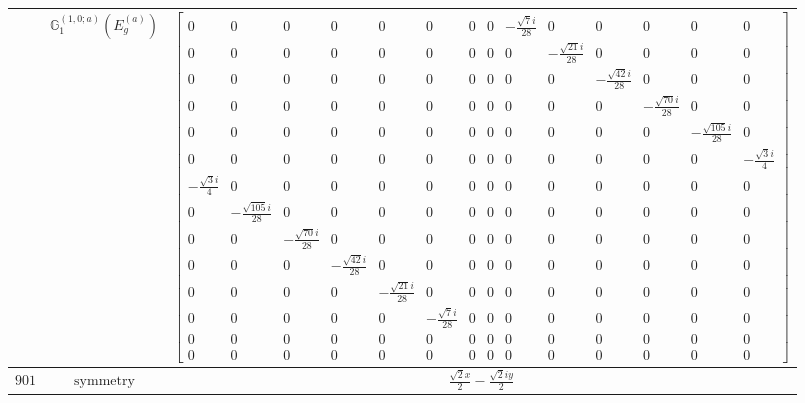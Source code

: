 \documentclass[fleqn,8pt,landscape]{jsarticle}
\begin{document}
\begin{longtable}{ccc}
$  $ & $ \mathbb{G}_{1}^{(1,0;a)}(E_{g}^{(a)}) $ & $ \begin{bmatrix} 0 & 0 & 0 & 0 & 0 & 0 & 0 & 0 & - \frac{\sqrt{7} i}{28} & 0 & 0 & 0 & 0 & 0 \\ 0 & 0 & 0 & 0 & 0 & 0 & 0 & 0 & 0 & - \frac{\sqrt{21} i}{28} & 0 & 0 & 0 & 0 \\ 0 & 0 & 0 & 0 & 0 & 0 & 0 & 0 & 0 & 0 & - \frac{\sqrt{42} i}{28} & 0 & 0 & 0 \\ 0 & 0 & 0 & 0 & 0 & 0 & 0 & 0 & 0 & 0 & 0 & - \frac{\sqrt{70} i}{28} & 0 & 0 \\ 0 & 0 & 0 & 0 & 0 & 0 & 0 & 0 & 0 & 0 & 0 & 0 & - \frac{\sqrt{105} i}{28} & 0 \\ 0 & 0 & 0 & 0 & 0 & 0 & 0 & 0 & 0 & 0 & 0 & 0 & 0 & - \frac{\sqrt{3} i}{4} \\ - \frac{\sqrt{3} i}{4} & 0 & 0 & 0 & 0 & 0 & 0 & 0 & 0 & 0 & 0 & 0 & 0 & 0 \\ 0 & - \frac{\sqrt{105} i}{28} & 0 & 0 & 0 & 0 & 0 & 0 & 0 & 0 & 0 & 0 & 0 & 0 \\ 0 & 0 & - \frac{\sqrt{70} i}{28} & 0 & 0 & 0 & 0 & 0 & 0 & 0 & 0 & 0 & 0 & 0 \\ 0 & 0 & 0 & - \frac{\sqrt{42} i}{28} & 0 & 0 & 0 & 0 & 0 & 0 & 0 & 0 & 0 & 0 \\ 0 & 0 & 0 & 0 & - \frac{\sqrt{21} i}{28} & 0 & 0 & 0 & 0 & 0 & 0 & 0 & 0 & 0 \\ 0 & 0 & 0 & 0 & 0 & - \frac{\sqrt{7} i}{28} & 0 & 0 & 0 & 0 & 0 & 0 & 0 & 0 \\ 0 & 0 & 0 & 0 & 0 & 0 & 0 & 0 & 0 & 0 & 0 & 0 & 0 & 0 \\ 0 & 0 & 0 & 0 & 0 & 0 & 0 & 0 & 0 & 0 & 0 & 0 & 0 & 0 \end{bmatrix} $ \\ \hline
$ 901 $ & $ \text{symmetry} $ & $ \frac{\sqrt{2} x}{2} - \frac{\sqrt{2} i y}{2} $ \\

\end{longtable}
\end{document}
